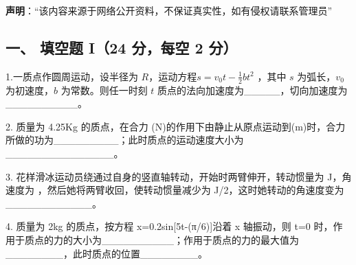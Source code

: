 
\textbf{声明}：“该内容来源于网络公开资料，不保证真实性，如有侵权请联系管理员”

\subsection{一、 填空题 I（24 分，每空 2 分）}
1.一质点作圆周运动，设半径为 $R$，运动方程$s=v_0t-\frac{1}{2}bt^2$ ，其中 $s$ 为弧长，$v_0$为初速度，$b$ 为常数。则任一时刻 $t$ 质点的法向加速度为_____，切向加速度为__________。

2. 质量为 4.25Kg 的质点，在合力 (N)的作用下由静止从原点运动到(m)时，合力所做的功为_________；此时质点的运动速度大小为_______________。

3. 花样滑冰运动员绕通过自身的竖直轴转动，开始时两臂伸开，转动惯量为 J，角速度为 ，然后她将两臂收回，使转动惯量减少为 J/2，这时她转动的角速度变为____________。

4. 质量为 2kg 的质点，按方程 x=0.2sin[5t-(π/6)]沿着 x 轴振动，则 t=0 时，作用于质点的力的大小为__________；作用于质点的力的最大值为________，此时质点的位置________。
